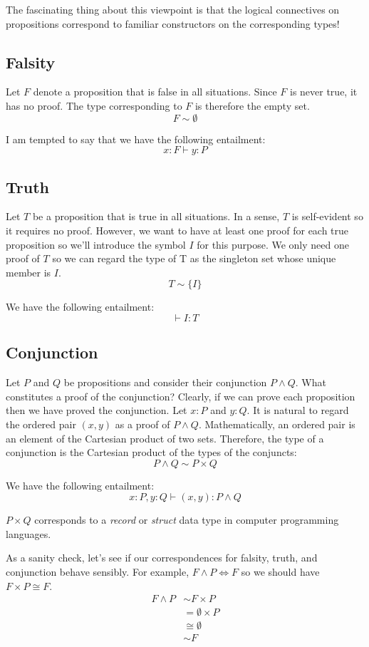 \documentclass[11pt, oneside]{article}   	%
\begin{document}
The fascinating thing about this viewpoint is that the logical connectives on propositions correspond to familiar constructors
on the corresponding types!

\subsection{Falsity}

Let $F$ denote a proposition that is false in all situations.
Since $F$ is never true, it has no proof.
The type corresponding to $F$ is therefore the empty set.
$$
F \sim \emptyset
$$

I am tempted to say that we have the following entailment:
$$
x : F \vdash y : P
$$

\subsection{Truth}

Let $T$ be a proposition that is true in all situations.
In a sense, $T$ is self-evident so it requires no proof.
However, we want to have at least one proof for each true proposition so we'll introduce the
symbol $I$ for this purpose.
We only need one proof of $T$ so we can regard the type of T as the singleton set whose unique member is $I$.
$$
T \sim \{ I \}
$$

We have the following entailment:
$$
\vdash I : T
$$

\subsection{Conjunction}

Let $P$ and $Q$ be propositions and consider their conjunction $P \land Q$.
What constitutes a proof of the conjunction?
Clearly, if we can prove each proposition then we have proved the conjunction.
Let $x : P$ and $y : Q$.
It is natural to regard the ordered pair $(x, y)$ as a proof of $P \land Q$.
Mathematically, an ordered pair is an element of the Cartesian product of two sets.
Therefore, the type of a conjunction is the Cartesian product of the types of the conjuncts:
$$
P \land Q \sim P \times Q
$$

We have the following entailment:
$$
x : P, y : Q \vdash (x, y) : P \land Q
$$

$P \times Q$ corresponds to a {\it record} or {\it struct} data type in computer programming languages.

As a sanity check, let's see if our correspondences for falsity, truth, and conjunction behave sensibly.
For example, $F \land P \Leftrightarrow F$ so we should have $F \times P \cong F$.
\begin{align*}
F \land P	&\sim F \times P \\
		&= \emptyset \times P \\
		&\cong \emptyset \\
		&\sim F
\end{align*}
\end{document}
